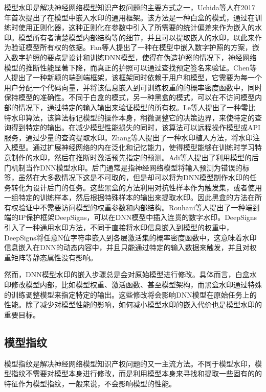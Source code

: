 模型水印\cite{GYKJ202207020}是解决神经网络模型知识产权问题的主要方式之一，Uchida等人\cite{uchida2017embedding}在2017年首次提出了在模型中嵌入水印的通用框架。该方法是一种白盒的模式，通过在训练时使用正则化器，这种正则化在参数中引入了所需要的统计偏差来作为嵌入的水印。模型所有者清楚模型内部结构等的细节，并且可以提取嵌入的水印，以此来作为验证模型所有权的依据\cite{zhang2021deep}。Fan等人\cite{fan2019rethinking}提出了一种在模型中嵌入数字护照的方案，嵌入数字护照的要点是设计和训练DNN模型，使得在伪造护照的情况下，神经网络模型的推断性能显著下降，而真正的护照可以通过查找预定签名来验证。Chen等人\cite{chen2018deepmarks}提出了一种新颖的端到端框架，该框架同时依赖于用户和模型，它需要为每一个用户分配一个代码向量，并将该信息嵌入到可训练权重的的概率密度函数中，同时保持模型的准确性。不同于白盒的模式，另一种黑盒的模式，可以在不访问模型内部的情况下，通过特定的输入输出来验证模型的所有权。Le等人\cite{le2020adversarial}提出了一种零比特水印算法，该算法标记模型的操作本身，稍微调整它的决策边界，来使特定的查询得到特定的输出。在减少模型性能损失的同时，该算法可以远程操作模型或API服务，通过少量的查询提取水印。Zhang等人\cite{zhang2018protecting}提出了一种水印植入方法，将水印注入模型。通过扩展神经网络的内在泛化和记忆能力，使得模型能够在训练时学习特意制作的水印，然后在推断时激活预先指定的预测。Adi等人\cite{adi2018turning}提出了利用模型的后门机制当作DNN模型水印。后门通常是指神经网络模型将输入预测为错误的标签，虽然在大多数情况下这是不可取的，但是却可以将为DNN模型制作水印的任务转化为设计后门的任务。这些黑盒的方法利用对抗性样本作为触发集，或者使用一组特定的训练样本，然后根据特殊样本的输出来提取水印。因此黑盒的方法在所有权验证中不需要访问模型的权重参数和内部结构。Rouhani等人\cite{rouhani2018deepsigns}提出了一种端到端的IP保护框架DeepSigns，可以在DNN模型中插入连贯的数字水印。DeepSigns引入了一种通用水印方法，不同于直接将水印信息嵌入到模型的权重中，DeepSigns将任意N位字符串嵌入到各层激活集的概率密度函数中，这意味着水印信息嵌入在DNN的动态内容中，并且只能通过特定的输入数据来触发，并且对权重矩阵等静态属性没有影响。

然而，DNN模型水印的嵌入步骤总是会对原始模型进行修改。具体而言，白盒水印修改模型内部，比如模型权重、激活函数、甚至模型架构，而黑盒水印通过特殊的训练调整模型来指定特定的输出。这些修改将会影响DNN模型在原始任务上的性能。除了减少对模型性能的影响，如何减小模型水印的嵌入代价也是模型水印的重要目标。

\subsection{模型指纹}

模型指纹是解决神经网络模型知识产权问题的又一主流方法。不同于模型水印，模型指纹不需要对模型本身进行修改，而是利用模型本身来寻找和提取一些固有的的特征作为模型指纹，一般来说，不会影响模型的性能。

